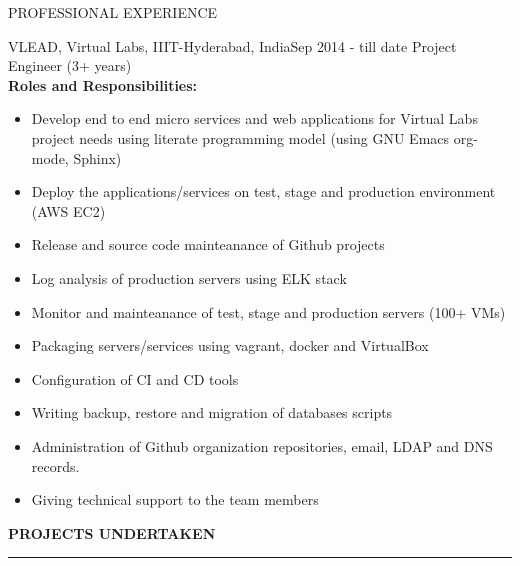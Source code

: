 \documentclass{resume} %
\begin{document}
\begin{rSection}{PROFESSIONAL EXPERIENCE}

   \begin{rSubsection}
    {VLEAD, Virtual Labs, IIIT-Hyderabad, India}{Sep 2014 - till date}
    {Project Engineer} {(3+ years)} \hfill 
    \\    
    \textbf{Roles and Responsibilities:}
    \begin{itemize}
      
    \item Develop end to end micro services and web applications for
      Virtual Labs project needs using literate programming model
      (using GNU Emacs org-mode, Sphinx)

    \item Deploy the applications/services on test, stage and
      production environment (AWS EC2)

    \item Release and source code mainteanance of Github projects

    \item Log analysis of production servers using ELK stack      
      
    \item Monitor and mainteanance of test, stage and production
      servers (100+ VMs)
      
    \item Packaging servers/services using vagrant,
      docker and VirtualBox

    \item Configuration of CI and CD tools
      
    \item Writing backup, restore and migration of databases scripts

    \item Administration of Github organization repositories,
      email, LDAP and DNS records.

    \item Giving technical support to the team members
    \end{itemize}

    \hfill



\textbf{PROJECTS UNDERTAKEN}
\sectionlineskip \\ \hrule



\end{rSubsection}
\end{rSection}
\end{document}
